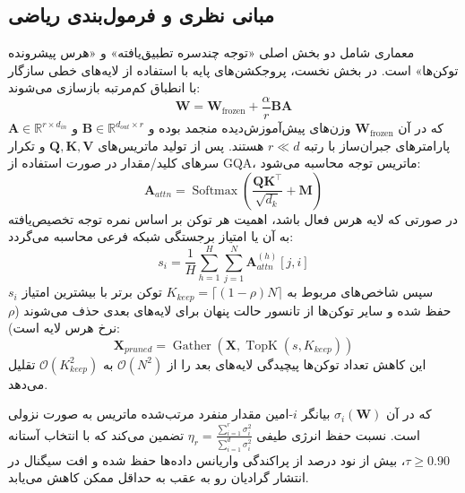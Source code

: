 \subsection{مبانی نظری و فرمول‌بندی ریاضی}
معماری  شامل دو بخش اصلی «توجه چندسره تطبیق‌یافته» و «هرس پیشرونده توکن‌ها» است. در بخش نخست، پروجکشن‌های پایه با استفاده از لایه‌های خطی سازگار با انطباق کم‌مرتبه بازسازی می‌شوند:
\begin{equation}
\mathbf{W} = \mathbf{W}_{\text{frozen}} + \frac{\alpha}{r} \mathbf{B} \mathbf{A}
\end{equation}
که در آن $\mathbf{W}_{\text{frozen}}$ وزن‌های پیش‌آموزش‌دیده منجمد بوده و $\mathbf{B} \in \mathbb{R}^{d_{out} \times r}$ و $\mathbf{A} \in \mathbb{R}^{r \times d_{in}}$ پارامترهای جبران‌ساز با رتبه $r \ll d$ هستند. پس از تولید ماتریس‌های $\mathbf{Q}, \mathbf{K}, \mathbf{V}$ و تکرار سرهای کلید/مقدار در صورت استفاده از GQA، ماتریس توجه محاسبه می‌شود:
\begin{equation}
\mathbf{A}_{attn} = \operatorname{Softmax}\left(\frac{\mathbf{Q} \mathbf{K}^\top}{\sqrt{d_k}} + \mathbf{M}\right)
\end{equation}
در صورتی که لایه هرس فعال باشد، اهمیت هر توکن بر اساس نمره توجه تخصیص‌یافته به آن یا امتیاز برجستگی شبکه فرعی محاسبه می‌گردد:
\begin{equation}
s_i = \frac{1}{H} \sum_{h=1}^H \sum_{j=1}^N \mathbf{A}_{attn}^{(h)}[j, i]
\end{equation}
سپس شاخص‌های مربوط به $K_{keep} = \lceil (1 - \rho) N \rceil$ توکن برتر با بیشترین امتیاز $s_i$ حفظ شده و سایر توکن‌ها از تانسور حالت پنهان برای لایه‌های بعدی حذف می‌شوند ($\rho$ نرخ هرس لایه است):
\begin{equation}
\mathbf{X}_{pruned} = \operatorname{Gather}(\mathbf{X}, \operatorname{TopK}(s, K_{keep}))
\end{equation}
این کاهش تعداد توکن‌ها پیچیدگی لایه‌های بعد را از $\mathcal{O}(N^2)$ به $\mathcal{O}(K_{keep}^2)$ تقلیل می‌دهد.

که در آن $\sigma_i(\mathbf{W})$ بیانگر $i$-امین مقدار منفرد مرتب‌شده ماتریس به صورت نزولی است. نسبت حفظ انرژی طیفی $\eta_r = \frac{\sum_{i=1}^r \sigma_i^2}{\sum_{i=1}^{d} \sigma_i^2}$ تضمین می‌کند که با انتخاب آستانه $\tau \ge 0.90$، بیش از نود درصد از پراکندگی واریانس داده‌ها حفظ شده و افت سیگنال در انتشار گرادیان رو به عقب به حداقل ممکن کاهش می‌یابد.

